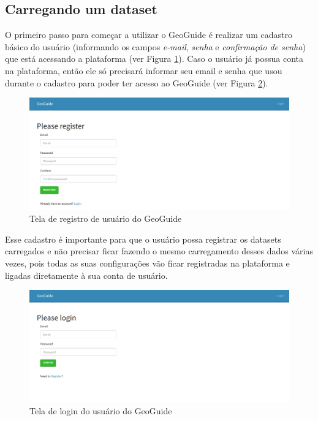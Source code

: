 \subsection{Carregando um dataset}

O primeiro passo para começar a utilizar o GeoGuide é realizar um cadastro básico do usuário (informando os campos \textit{e-mail}, \textit{senha} e \textit{confirmação de senha}) que está acessando a plataforma (ver Figura \ref{fig:geoguide-register}). Caso o usuário já possua conta na plataforma, então ele só precisará informar seu email e senha que usou durante o cadastro para poder ter acesso ao GeoGuide (ver Figura \ref{fig:geoguide-login}).

\begin{figure}[h]
	\centering
	\includegraphics[width=\textwidth]{images/geoguide-register.png}
	\caption{Tela de registro de usuário do GeoGuide}
	\label{fig:geoguide-register}
	\vspace{-10pt}
\end{figure}

Esse cadastro é importante para que o usuário possa registrar os datasets carregados e não precisar ficar fazendo o mesmo carregamento desses dados várias vezes, pois todas as suas configurações vão ficar registradas na plataforma e ligadas diretamente à sua conta de usuário.

\begin{figure}[h]
	\centering
	\includegraphics[width=\textwidth]{images/geoguide-login.png}
	\caption{Tela de login do usuário do GeoGuide}
	\label{fig:geoguide-login}
	\vspace{-10pt}
\end{figure}

